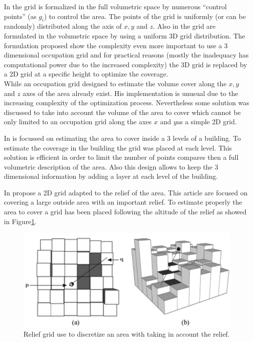 In \cite{82*chrysostomou2012} the grid is formalized in the full volumetric space by numerous “control points” (as $g_i$) to control the area. The points of the grid is uniformly (or can be randomly) distributed along the axis of $x, y$ and $z$. Also in \cite{87*morsly2012} the grid are formulated in the volumetric space by using a uniform 3D grid distribution. The formulation proposed show the complexity even more important to use a 3 dimensional occupation grid and for practical reasons (mostly the inadequacy has computational power due to the increased complexity) the 3D grid is replaced by a 2D grid at a specific height to optimize the coverage. \\ 

While an occupation grid designed to estimate the volume cover along the $ x, y $ and $ z $ axes of the area already exist. His implementation is unusual due to the increasing complexity of the optimization process.  
Nevertheless some solution was discussed \citep{141*akbarzadeh2013,83*van2009} to take into account the volume of the area to cover which cannot be only limited to an occupation grid along the axes $ x $ and $ y $as a simple 2D grid.

In \cite{83*van2009} is focussed on estimating the area to cover inside a 3 levels of a building. To estimate the coverage in the building the grid was placed at each level. This solution is efficient in order to limit the number of points compares then a full volumetric description of the area. Also this design allows to keep the 3 dimensional information by adding a layer at each level of the building.  

In \citep{141*akbarzadeh2013} propose a 2D grid adapted to the relief of the area. This article are focused on covering a large outside area with an important relief. To estimate properly the area to cover a grid has been placed following the altitude of the relief as showed in Figure\ref{fig:grilleRef141}. 

\begin{figure}[t!]
\begin{center}
   \includegraphics[width=\linewidth]{img/grilleRef141.png}
  \caption{ Relief grid use to discretize  an area with taking in account the relief.}\label{fig:grilleRef141}
  \endminipage\hfill
  \end{center}
\end{figure}

